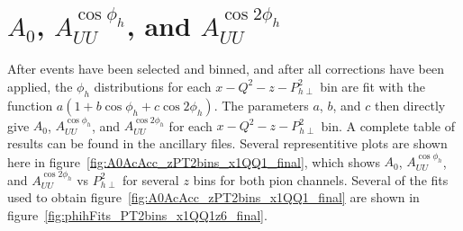 \chapter{$A_0$, $A_{UU}^{\cos\phi_h}$, and $A_{UU}^{\cos 2\phi_h}$}
\label{cha:A0AcAcc}

After events have been selected and binned, and after all corrections have been applied, the $\phi_h$ distributions for each $x-Q^2-z-P_{h\perp}^2$ bin are fit with the function $a(1 + b\cos\phi_h + c\cos 2\phi_h)$.
The parameters $a$, $b$, and $c$ then directly give $A_0$, $A_{UU}^{\cos\phi_h}$, and $A_{UU}^{\cos 2\phi_h}$ for each $x-Q^2-z-P_{h\perp}^2$ bin.
A complete table of results can be found in the ancillary files.
Several representitive plots are shown here in figure~\ref{fig:A0AcAcc_zPT2bins_x1QQ1_final}, which shows $A_0$, $A_{UU}^{\cos\phi_h}$, and $A_{UU}^{\cos 2\phi_h}$ vs $P_{h\perp}^2$ for several $z$ bins for both pion channels.
Several of the fits used to obtain figure~\ref{fig:A0AcAcc_zPT2bins_x1QQ1_final} are shown in figure~\ref{fig:phihFits_PT2bins_x1QQ1z6_final}.
%
